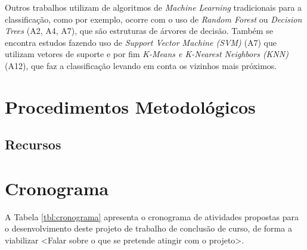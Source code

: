 Outros trabalhos utilizam de algoritmos de \emph{Machine Learning} tradicionais para a classificação, como por exemplo, ocorre com o uso de \emph{Random Forest} ou \emph{Decision Trees}  (A2, A4, A7), que são estruturas de árvores de decisão. Também se encontra estudos fazendo uso de \emph{Support Vector Machine (SVM)} (A7) que utilizam vetores de suporte e por fim \emph{K-Means e K-Nearest Neighbors (KNN)} (A12), que faz a classificação levando em conta os vizinhos mais próximos.

\chapter{Procedimentos Metodológicos}
\label{chap:metodologia}

\section{Recursos}

\chapter{Cronograma}
\label{chap:cronograma}

A Tabela \ref{tbl:cronograma} apresenta o cronograma de atividades propostas para o desenvolvimento deste projeto de trabalho de conclusão de curso, de forma a viabilizar <Falar sobre o que se pretende atingir com o projeto>.

